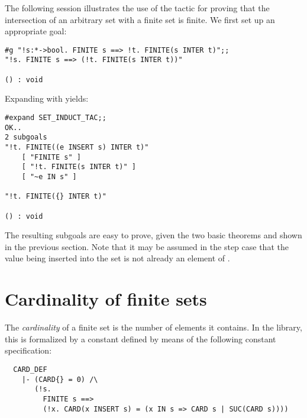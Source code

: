 The following session illustrates the use of the tactic 
for proving that the intersection of an arbitrary set  with a finite set
 is finite.  We first set up an appropriate goal:

\setcounter{sessioncount}{1}
\begin{session}\begin{verbatim}
#g "!s:*->bool. FINITE s ==> !t. FINITE(s INTER t)";;
"!s. FINITE s ==> (!t. FINITE(s INTER t))"

() : void
\end{verbatim}\end{session}

\noindent Expanding with  yields:

\begin{session}\begin{verbatim}
#expand SET_INDUCT_TAC;;
OK..
2 subgoals
"!t. FINITE((e INSERT s) INTER t)"
    [ "FINITE s" ]
    [ "!t. FINITE(s INTER t)" ]
    [ "~e IN s" ]

"!t. FINITE({} INTER t)"

() : void
\end{verbatim}\end{session}

\noindent The resulting subgoals are easy to prove, given the two basic
theorems  and  shown in the previous
section. Note that it may be assumed in the step case that the value 
being inserted into the set  is not already an element of
.%

\section{Cardinality of finite sets}

The {\it cardinality\/} of a finite set is the number of elements it contains.
In the  library, this is formalized by a constant 
defined by means of the following constant specification:

\begin{hol}
\begin{verbatim}
  CARD_DEF
    |- (CARD{} = 0) /\
       (!s.
         FINITE s ==>
         (!x. CARD(x INSERT s) = (x IN s => CARD s | SUC(CARD s))))
\end{verbatim}\end{hol}

